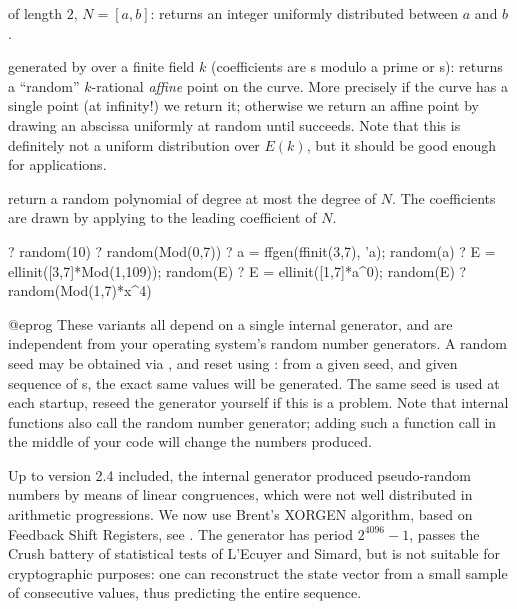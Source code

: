 \item {} of length $2$, $N = [a,b]$: returns an integer uniformly
distributed between $a$ and $b$.

\item {} generated by  over a finite field $k$
(coefficients are s modulo a prime or s): returns a
``random'' $k$-rational \emph{affine} point on the curve. More precisely
if the curve has a single point (at infinity!) we return it; otherwise
we return an affine point by drawing an abscissa uniformly at
random until  succeeds. Note that this is definitely not a
uniform distribution over $E(k)$, but it should be good enough for
applications.

\item {} return a random polynomial of degree at most the degree of $N$.
The coefficients are drawn by applying  to the leading
coefficient of $N$.

\bprog
? random(10)
? random(Mod(0,7))
? a = ffgen(ffinit(3,7), 'a); random(a)
? E = ellinit([3,7]*Mod(1,109)); random(E)
? E = ellinit([1,7]*a^0); random(E)
? random(Mod(1,7)*x^4)

@eprog
These variants all depend on a single internal generator, and are
independent from your operating system's random number generators.
A random seed may be obtained via , and reset
using : from a given seed, and given sequence of s,
the exact same values will be generated. The same seed is used at each
startup, reseed the generator yourself if this is a problem. Note that
internal functions also call the random number generator; adding such a
function call in the middle of your code will change the numbers produced.

Up to
version 2.4 included, the internal generator produced pseudo-random numbers
by means of linear congruences, which were not well distributed in arithmetic
progressions. We now
use Brent's XORGEN algorithm, based on Feedback Shift Registers, see
. The generator has period
$2^{4096}-1$, passes the Crush battery of statistical tests of L'Ecuyer and
Simard, but is not suitable for cryptographic purposes: one can reconstruct
the state vector from a small sample of consecutive values, thus predicting
the entire sequence.

